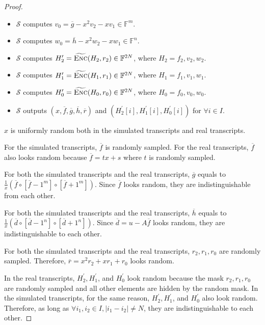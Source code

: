 \begin{proof}
\begin{itemize}
    \item $\mathcal{S}$ computes $v_0 = \overline{g} - x^2 v_2 - x v_1 \in \mathbb{F}^m$.

    \item $\mathcal{S}$ computes $w_0 = \overline{h} - x^2 w_2 - x w_1 \in \mathbb{F}^n$.  
    
    \item $\mathcal{S}$ computes $H_2^\prime = \widetilde{\textsc{Enc}}(H_2, r_2) \in \mathbb{F}^{2N}$, where $H_2 = f_2, v_2, w_2$.

    \item $\mathcal{S}$ computes $H_1^\prime = \widetilde{\textsc{Enc}}(H_1, r_1) \in \mathbb{F}^{2N}$, where $H_1 = f_1, v_1, w_1$.

    \item $\mathcal{S}$ computes $H_0^\prime = \widetilde{\textsc{Enc}}(H_0, r_0) \in \mathbb{F}^{2N}$, where $H_0 = f_0, v_0, w_0$.
    
    \item $\mathcal{S}$ outputs $(x, \overline{f}, \overline{g}, \overline{h}, \overline{r})$ and $(H_2^\prime[i], H_1^\prime[i], H_0^\prime[i])$ for $\forall i \in I$.
\end{itemize}

$x$ is uniformly random both in the simulated transcripts and real transcripts. 

For the simulated transcripts, $\overline{f}$ is randomly sampled. For the real transcripts, $\overline{f}$ also looks random because $\overline{f} = tx + s$ where $t$ is randomly sampled.

For both the simulated transcripts and the real transcripts, $\overline{g}$ equals to $\frac{1}{x} (\overline{f} \circ [\overline{f} - 1^m] \circ [\overline{f} + 1^m])$. Since $\overline{f}$ looks random, they are indistinguishable from each other.

For both the simulated transcripts and the real transcripts, $\overline{h}$ equals to $\frac{1}{x} (\overline{d} \circ [\overline{d} - 1^n] \circ [\overline{d} + 1^n])$. Since $\overline{d} = u - A\overline{f}$ looks random, they are indistinguishable to each other.

For both the simulated transcripts and the real transcripts, $r_2, r_1, r_0$ are randomly sampled. Therefore, $\overline{r} = x^2 r_2 + x r_1 + r_0$ looks random.

In the real transcripts, $H_2^\prime, H_1^\prime$, and $H_0^\prime$ look random because the mask $r_2, r_1, r_0$ are randomly sampled and all other elements are hidden by the random mask. In the simulated transcripts, for the same reason, $H_2^\prime, H_1^\prime$, and $H_0^\prime$ also look random. Therefore, as long as $\forall i_1, i_2 \in I, |i_1 - i_2| \neq N$, they are indistinguishable to each other.

\end{proof}


